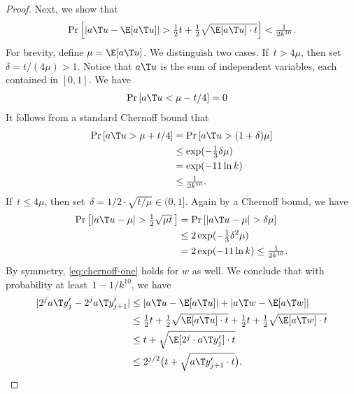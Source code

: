 \begin{proof}
    Next, we show that
    \begin{equation}\label{eq:chernoff-one}
        \Pr \left[ | a\T u - \E[a\T u] | > \tfrac{1}{2} t + \tfrac{1}{2} \sqrt{\E[a\T u]  \cdot t} \right] < \tfrac{1}{2 k^{10}}.
    \end{equation}
    For brevity, define $\mu = \E[a\T u]$.
    We distinguish two cases. If~$t > 4\mu$, then set~$\delta = t / (4\mu) > 1$.
    Notice that $a\T u$ is the sum of independent variables, each contained in $[0,1]$.
    We have
    \begin{align*}
        \Pr \left[ a\T u < \mu - t/4 \right] &= 0
    \end{align*}
    It follows from a standard Chernoff bound that
    \begin{align*}
        \Pr \left[ a\T u  > \mu + t/4 \right] 
        &= \Pr \left[ a\T u > (1 + \delta) \mu \right] \\
        &\le \exp(-\tfrac{1}{3} \delta \mu) \\
        &= \exp(- 11 \ln k) \\
        &\le \tfrac{1}{2 k^{10}}.
    \end{align*}
    If~$t \le 4\mu$, then set~$\delta= 1/2 \cdot \sqrt{t/\mu} \in (0,1]$. Again by a Chernoff bound, we have
    \begin{align*}
        \Pr \left[ |a\T u  - \mu| > \tfrac{1}{2}\sqrt{\mu t} \,\right]
        &= \Pr \left[ |a\T u - \mu| > \delta \mu \right] \\
        &\le 2 \exp(- \tfrac{1}{3} \delta^2 \mu) \\
        &= 2 \exp(- 11 \ln k) \le \tfrac{1}{2 k^{10}} .
    \end{align*}
    By symmetry, \cref{eq:chernoff-one} holds for $w$ as well. 
    We conclude that with probability at least~$1 - 1/k^{10}$, we have
    \begin{align*}
        | 2^j a\T y'_j - 2^j a\T y'_{j+1} | 
        &\le | a\T u - \E[a\T u] | + | a\T w - \E[a\T w] | \\ 
        &\le \tfrac{1}{2} t + \tfrac{1}{2} \sqrt{\E[a\T u]  \cdot t} + \tfrac{1}{2} t + \tfrac{1}{2} \sqrt{\E[a\T w] \cdot t} \\
        &\le t + \sqrt{\E[2^j \cdot a\T y'_j] \cdot t} \\
        &\le 2^{j/2} \big(t + \sqrt{a\T y'_{j+1} \cdot t}\big). \qedhere
    \end{align*}
\end{proof}